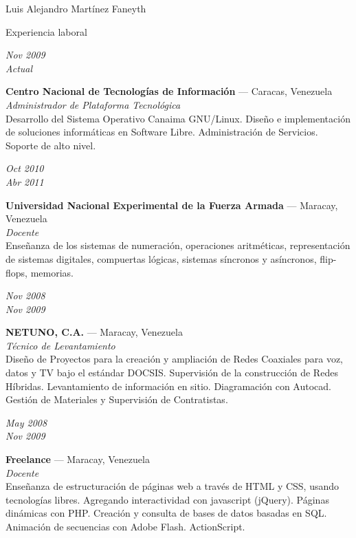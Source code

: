 \documentclass[11pt,letterpaper]{article}
\begin{document}
\begin{cv}{Luis Alejandro Mart\'inez Faneyth}
\begin{cvlist}{Experiencia laboral}
\item[{\parbox[t]{6em}{\textit{\large{Nov 2009\\Actual}}}}]{
	\parbox[t]{\linewidth}{
		\textbf{Centro Nacional de Tecnolog\'ias de Informaci\'on} --- Caracas, Venezuela\\
		\textit{Administrador de Plataforma Tecnol\'ogica}\\
		\footnotesize{Desarrollo del Sistema Operativo Canaima GNU/Linux. Dise\~no e implementaci\'on de soluciones inform\'aticas en Software Libre. Administraci\'on de Servicios. Soporte de alto nivel.}
	}
}
\item[{\parbox[t]{6em}{\textit{\large{Oct 2010\\Abr 2011}}}}]{
	\parbox[t]{\linewidth}{
		\textbf{Universidad Nacional Experimental de la Fuerza Armada} --- Maracay, Venezuela\\
		\textit{Docente}\\
		\footnotesize{Ense\~nanza de los sistemas de numeraci\'on, operaciones aritm\'eticas, representaci\'on de sistemas digitales, compuertas l\'ogicas, sistemas s\'incronos y as\'incronos, flip-flops, memorias.}
	}
}
\item[{\parbox[t]{6em}{\textit{\large{Nov 2008\\Nov 2009}}}}]{
	\parbox[t]{\linewidth}{
		\textbf{NETUNO, C.A.} --- Maracay, Venezuela\\
		\textit{T\'ecnico de Levantamiento}\\
		\footnotesize{Dise\~no de Proyectos para la creaci\'on y ampliaci\'on de Redes Coaxiales para voz, datos y TV bajo el est\'andar DOCSIS. Supervisi\'on de la construcci\'on de Redes H\'ibridas. Levantamiento de informaci\'on en sitio. Diagramaci\'on con Autocad. Gesti\'on de Materiales y Supervisi\'on de Contratistas.}
	}
}
\item[{\parbox[t]{6em}{\textit{\large{May 2008\\Nov 2009}}}}]{
	\parbox[t]{\linewidth}{
		\textbf{Freelance} --- Maracay, Venezuela\\
		\textit{Docente}\\
		\footnotesize{Ense\~nanza de estructuraci\'on de p\'aginas web a trav\'es de HTML y CSS, usando tecnolog\'ias libres. Agregando interactividad con javascript (jQuery). P\'aginas din\'amicas con PHP. Creaci\'on y consulta de bases de datos basadas en SQL. Animaci\'on de secuencias con Adobe Flash. ActionScript.}
	}
}
\end{cvlist}


\end{cv}
\end{document}
